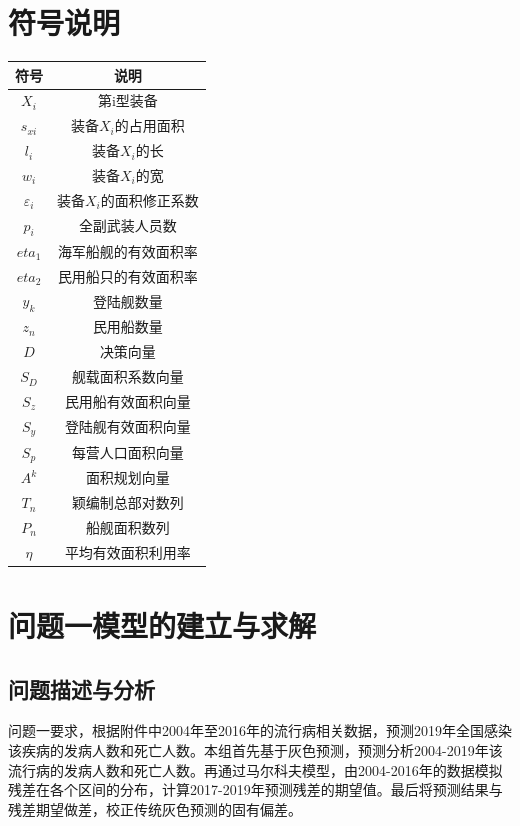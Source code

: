 \documentclass{whutmod}
\begin{document}
	
	\section{符号说明}
	\begin{table}[H]
	\label{biao} \centering

	\begin{tabular}{cc}
		\toprule[1.5pt]
		\multicolumn{1}{m{5cm}}{\centering 符号} & \multicolumn{1}{m{5cm}}{\centering 说明} \\
		\midrule[1pt]		
		$X_{i}$  &  第i型装备 \\ 
		$s_{xi}$  &  装备$X_{i}$的占用面积 \\ 
		$l_{i}$  & 装备$X_{i}$的长\\
		$w_{i}$  &  装备$X_{i}$的宽 \\ 
		$\varepsilon _{i}$ & 装备$X_{i}$的面积修正系数\\
		$p_{i}$	 &  全副武装人员数  \\ 
		$eta_{1}$ &  海军船舰的有效面积率 \\ 
		$eta_{2}$	 &  民用船只的有效面积率 \\ 
		$y_{k}$  &   登陆舰数量\\ 
		$z_{n}$  &  民用船数量\\	
		$D$ & 决策向量\\
		$S_{D}$ &  舰载面积系数向量\\ 
		$S_{z}$ & 民用船有效面积向量\\
		$S_{y}$ & 登陆舰有效面积向量\\
		$S_{p}$ & 每营人口面积向量\\
		$A^{k}$  & 面积规划向量\\
		$T_{n}$ & 颖编制总部对数列\\
		$P_{n}$ & 船舰面积数列\\
		$\eta $ &  平均有效面积利用率\\

		\bottomrule[1.5pt]
	\end{tabular}
\end{table}

	\section{问题一模型的建立与求解}
    \subsection{问题描述与分析}

    问题一要求，根据附件中2004年至2016年的流行病相关数据，预测2019年全国感染该疾病的发病人数和死亡人数。本组首先基于灰色预测，预测分析2004-2019年该流行病的发病人数和死亡人数。再通过马尔科夫模型，由2004-2016年的数据模拟残差在各个区间的分布，计算2017-2019年预测残差的期望值。最后将预测结果与残差期望做差，校正传统灰色预测的固有偏差。
   
\end{document}
